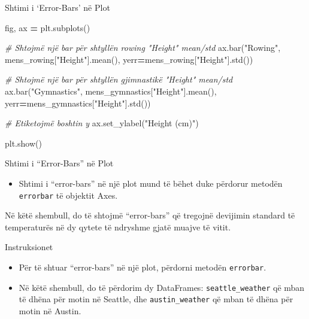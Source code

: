 \documentclass[
  ignorenonframetext,
]{beamer}
\newenvironment{Shaded}{\begin{snugshade}}{\end{snugshade}}
\newcommand{\CommentTok}[1]{\textcolor[rgb]{0.56,0.35,0.01}{\textit{#1}}}
\newcommand{\NormalTok}[1]{#1}
\newcommand{\OperatorTok}[1]{\textcolor[rgb]{0.81,0.36,0.00}{\textbf{#1}}}
\newcommand{\StringTok}[1]{\textcolor[rgb]{0.31,0.60,0.02}{#1}}
\providecommand{\tightlist}{%
  \setlength{\itemsep}{0pt}\setlength{\parskip}{0pt}}
\begin{document}
\begin{frame}[fragile]{Shtimi i `Error-Bars' në Plot}
\protect\hypertarget{shtimi-i-error-bars-nuxeb-plot-2}{}

\begin{Shaded}
\begin{Highlighting}[]
\NormalTok{fig, ax }\OperatorTok{=}\NormalTok{ plt.subplots()}

\CommentTok{\# Shtojmë një bar për shtyllën rowing "Height" mean/std}
\NormalTok{ax.bar(}\StringTok{"Rowing"}\NormalTok{, mens\_rowing[}\StringTok{"Height"}\NormalTok{].mean(), yerr}\OperatorTok{=}\NormalTok{mens\_rowing[}\StringTok{"Height"}\NormalTok{].std())}

\CommentTok{\# Shtojmë një bar për shtyllën gjimnastikë "Height" mean/std}
\NormalTok{ax.bar(}\StringTok{"Gymnastics"}\NormalTok{, mens\_gymnastics[}\StringTok{"Height"}\NormalTok{].mean(), yerr}\OperatorTok{=}\NormalTok{mens\_gymnastics[}\StringTok{"Height"}\NormalTok{].std())}

\CommentTok{\# Etiketojmë boshtin y}
\NormalTok{ax.set\_ylabel(}\StringTok{"Height (cm)"}\NormalTok{)}

\NormalTok{plt.show()}
\end{Highlighting}
\end{Shaded}
\end{frame}

\begin{frame}[fragile]{Shtimi i ``Error-Bars'' në Plot}
\protect\hypertarget{shtimi-i-error-bars-nuxeb-plot-3}{}
\begin{itemize}
\tightlist
\item
  Shtimi i ``error-bars'' në një plot mund të bëhet duke përdorur
  metodën \texttt{errorbar} të objektit Axes.
\end{itemize}

Në këtë shembull, do të shtojmë ``error-bars'' që tregojnë devijimin
standard të temperaturës në dy qytete të ndryshme gjatë muajve të vitit.
\end{frame}

\begin{frame}[fragile]{Instruksionet}
\protect\hypertarget{instruksionet-8}{}
\begin{itemize}
\item
  Për të shtuar ``error-bars'' në një plot, përdorni metodën
  \texttt{errorbar}.
\item
  Në këtë shembull, do të përdorim dy DataFrames:
  \texttt{seattle\_weather} që mban të dhëna për motin në Seattle, dhe
  \texttt{austin\_weather} që mban të dhëna për motin në Austin.
\end{itemize}
\end{frame}
\end{document}
